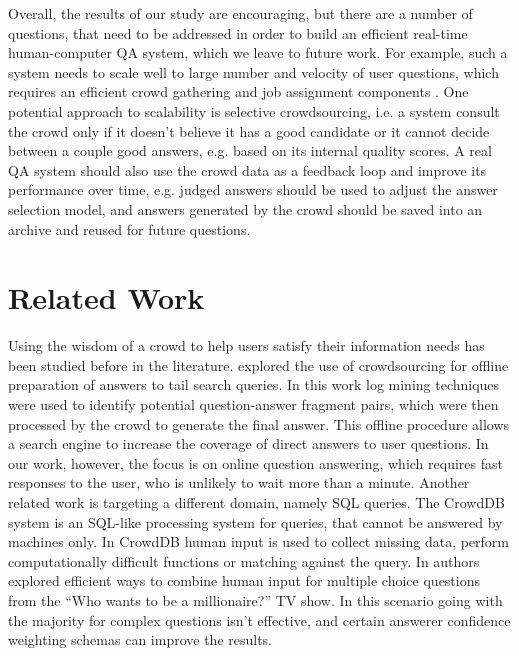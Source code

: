\documentclass[11pt,letterpaper]{article}
\begin{document}
Overall, the results of our study are encouraging, but there are a number of questions, that need to be addressed in order to build an efficient real-time human-computer QA system, which we leave to future work.
For example, such a system needs to scale well to large number and velocity of user questions, which requires an efficient crowd gathering and job assignment components \cite{bernstein2011crowds}.
One potential approach to scalability is selective crowdsourcing, i.e. a system consult the crowd only if it doesn't believe it has a good candidate or it cannot decide between a couple good answers, e.g. based on its internal quality scores.
A real QA system should also use the crowd data as a feedback loop and improve its performance over time, e.g. judged answers should be used to adjust the answer selection model, and answers generated by the crowd should be saved into an archive and reused for future questions.



\section{Related Work}
\label{sec:related_work}

Using the wisdom of a crowd to help users satisfy their information needs has been studied before in the literature.
 explored the use of crowdsourcing for offline preparation of answers to tail search queries.
In this work log mining techniques were used to identify potential question-answer fragment pairs, which were then processed by the crowd to generate the final answer.
This offline procedure allows a search engine to increase the coverage of direct answers to user questions.
In our work, however, the focus is on online question answering, which requires fast responses to the user, who is unlikely to wait more than a minute.
Another related work is targeting a different domain, namely SQL queries.
The CrowdDB system \cite{franklin2011crowddb} is an SQL-like processing system for queries, that cannot be answered by machines only.
In CrowdDB human input is used to collect missing data, perform computationally difficult functions or matching against the query.
In  authors explored efficient ways to combine human input for multiple choice questions from the ``Who wants to be a millionaire?'' TV show.
In this scenario going with the majority for complex questions isn't effective, and certain answerer confidence weighting schemas can improve the results.  
\end{document}
